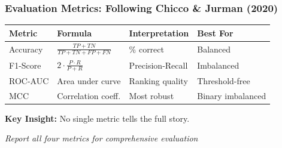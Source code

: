 \documentclass{beamer}
\begin{document}
\begin{frame}[fragile]
\frametitle{Evaluation Metrics: Following Chicco \& Jurman (2020)}

\vspace{-0.3cm}
{\small
\begin{tabular}{|p{1.5cm}|p{2.5cm}|p{2.5cm}|p{1.8cm}|}
\hline
\textbf{Metric} & \textbf{Formula} & \textbf{Interpretation} & \textbf{Best For} \\
\hline
Accuracy & $\frac{TP+TN}{TP+TN+FP+FN}$ & \% correct & Balanced \\
\hline
F1-Score & $2 \cdot \frac{P \cdot R}{P+R}$ & Precision-Recall & Imbalanced \\
\hline
ROC-AUC & Area under curve & Ranking quality & Threshold-free \\
\hline
MCC & Correlation coeff. & Most robust & Binary imbalanced \\
\hline
\end{tabular}
}

\vspace{0.5cm}
\textbf{Key Insight:} No single metric tells the full story.

\vspace{0.3cm}
\begin{center}
    \textit{Report all four metrics for comprehensive evaluation}
\end{center}

\end{frame}
\end{document}
